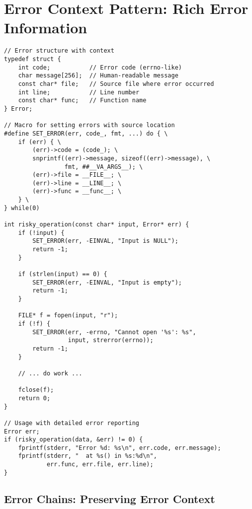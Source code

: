 \section{Error Context Pattern: Rich Error Information}

\begin{lstlisting}
// Error structure with context
typedef struct {
    int code;           // Error code (errno-like)
    char message[256];  // Human-readable message
    const char* file;   // Source file where error occurred
    int line;           // Line number
    const char* func;   // Function name
} Error;

// Macro for setting errors with source location
#define SET_ERROR(err, code_, fmt, ...) do { \
    if (err) { \
        (err)->code = (code_); \
        snprintf((err)->message, sizeof((err)->message), \
                 fmt, ##__VA_ARGS__); \
        (err)->file = __FILE__; \
        (err)->line = __LINE__; \
        (err)->func = __func__; \
    } \
} while(0)

int risky_operation(const char* input, Error* err) {
    if (!input) {
        SET_ERROR(err, -EINVAL, "Input is NULL");
        return -1;
    }

    if (strlen(input) == 0) {
        SET_ERROR(err, -EINVAL, "Input is empty");
        return -1;
    }

    FILE* f = fopen(input, "r");
    if (!f) {
        SET_ERROR(err, -errno, "Cannot open '%s': %s",
                  input, strerror(errno));
        return -1;
    }

    // ... do work ...

    fclose(f);
    return 0;
}

// Usage with detailed error reporting
Error err;
if (risky_operation(data, &err) != 0) {
    fprintf(stderr, "Error %d: %s\n", err.code, err.message);
    fprintf(stderr, "  at %s() in %s:%d\n",
            err.func, err.file, err.line);
}
\end{lstlisting}

\subsection{Error Chains: Preserving Error Context}

